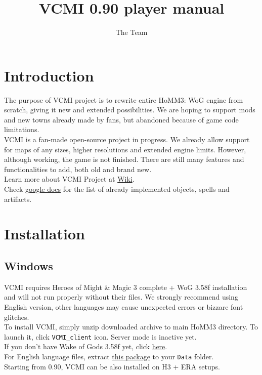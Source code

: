 \documentclass[a4size,final]{article}
\begin{document}
\normalsize
\pagestyle{plain}
\setcounter{secnumdepth}{1}
\title{\Huge VCMI 0.90 player manual}
\author{The Team}
\maketitle
\section{Introduction}
The purpose of VCMI project is to rewrite entire HoMM3: WoG engine from scratch, giving it new and extended possibilities. We are hoping to support mods and new towns already made by fans, but abandoned because of game code limitations.\\
VCMI is a fan-made open-source project in progress. We already allow support for maps of any sizes, higher resolutions and extended engine limits. However, although working, the game is not finished. There are still many features and functionalities to add, both old and brand new.\smallskip\\
Learn more about VCMI Project at \href{http://wiki.vcmi.eu/index.php?title=VCMI}{Wiki}.\\
Check \href{http://spreadsheets.google.com/ccc?key=pRhYM0YkAF9lIpLe4raNAWA&hl=pl}{google docs} for the list of already implemented objects, spells and artifacts.
\section{Installation}
\subsection{Windows}
VCMI requires Heroes of Might \& Magic 3 complete + WoG 3.58f installation and will not run properly without their files. We strongly recommend using English version, other languages may cause unexpected errors or bizzare font glitches.\\
To install VCMI, simply unzip downloaded archive to main HoMM3 directory. To launch it, click \texttt{VCMI\_client} icon. Server mode is inactive yet.\medskip\\
If you don't have Wake of Gods 3.58f yet, click \href{http://www.maps4heroes.com/heroes3/files/allinone_358f.zip}{here}.\\
For English language files, extract \href{http://download.vcmi.eu/dataEN.7z}{this package} to your \texttt{Data} folder.\bigskip\\
Starting from 0.90, VCMI can be also installed on H3 + ERA setups.
\end{document}
